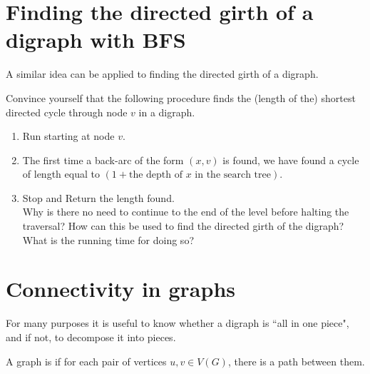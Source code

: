 \section{Finding the directed girth of a digraph with BFS}

A similar idea can be applied to finding the directed girth of a digraph.

\begin{Boxample}[2.5]
Convince yourself that the following procedure finds the (length of the) shortest directed cycle through node $v$ in a digraph.
\begin{enumerate}
\item Run  starting at node $v$.
\item The first time a back-arc of the form $(x,v)$ is found, we have found a cycle of length equal to $(1 + \mbox{the depth of }x\mbox{ in the search tree})$. 
\item Stop and Return the length found.\\

\vspace{2.5cm}
Why is there no need to continue to the end of the level before halting the traversal? How can this be used to find the directed girth of the digraph? What is the running time for doing so?
\end{enumerate}
\end{Boxample}

\section{Connectivity in graphs}

For many purposes it is useful to know whether a digraph is ``all in one
piece", and if not, to decompose it into pieces.


\begin{Definition} 
A graph is  if for each pair of 
vertices $u, v \in V(G)$, there is a path between them.
\end{Definition}

